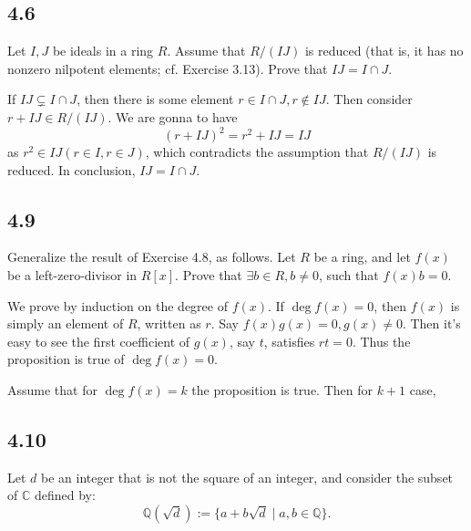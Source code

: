 \documentclass[a4paper, pdf, 12pt]{article}
\makeatletter
\renewenvironment{proof}[1][\proofname]{\par
  \pushQED{\qed}%
  \normalfont \topsep6\p@\@plus6\p@\relax
  \trivlist
  \item[%
    \hskip\labelsep
    \normalfont\bfseries %
    #1%
    \@addpunct{.}%
  ]\ignorespaces
}{%
  \popQED\endtrivlist\@endpefalse
}
\let\qed\relax %
\DeclareRobustCommand{\qed}{%
  \ifmmode \mathqed
  \else
    \leavevmode\unskip\penalty\@M\hbox{}\nobreak\hspace{.5em minus .1em}%
    \hbox{\qedsymbol}%
  \fi
}
\makeatother
\begin{document}
\subsection*{4.6}
Let $I, J$ be ideals in a ring $R$. Assume that $R/(IJ)$ is reduced (that is, it has no 
nonzero nilpotent elements; cf. Exercise 3.13). Prove that $IJ = I \cap J$.
\begin{proof}
  If $IJ\subsetneq I\cap J$, then there is some element $r\in I\cap J, r\notin IJ$. Then 
  consider $r+IJ\in R/(IJ)$. We are gonna to have 
  $$
  (r+IJ)^2 = r^2 + IJ = IJ
  $$ as $r^2 \in IJ(r\in I, r\in J)$, which contradicts the assumption
  that $R/(IJ)$ is reduced. In conclusion, $IJ = I\cap J$.
\end{proof}

\subsection*{4.9}
Generalize the result of Exercise 4.8, as follows. Let $R$ be a ring, and let $f(x)$ be a left-zero-divisor in $R[x]$. 
Prove that $\exists b \in R, b \neq 0$, such that $f(x)b = 0$.
\begin{proof}
  We prove by induction on the degree of $f(x)$. If $\deg f(x) = 0$, then $f(x)$ is simply 
  an element of $R$, written as $r$. Say $f(x)g(x) = 0, g(x)\neq 0$. Then it's easy to see 
  the first coefficient of $g(x)$, say $t$, satisﬁes $rt = 0$. Thus the proposition 
  is true of $\deg f(x) = 0$.

  Assume that for $\deg f(x) = k$ the proposition is true. Then for $k+1$ case, 
\end{proof}

\subsection*{4.10}
Let $d$ be an integer that is not the square of an integer, and consider the subset of $\mathbb{C}$ deﬁned by:
$$
\mathbb{Q} (\sqrt{d}) := \{ a + b \sqrt{d} \mid a, b \in \mathbb{Q} \} .
$$
\end{document}
